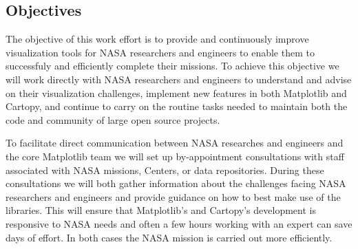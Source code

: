 \documentclass[12pt]{article}
\numberwithin{page}{section}
\begin{document}
\subsection{Objectives}



%

The objective of this work effort is to provide and continuously improve
visualization tools for NASA researchers and engineers to enable them to
successfuly and efficiently complete their missions.
To achieve this objective we will work directly with NASA
researchers and engineers to understand and advise on their visualization
challenges, implement new features in both Matplotlib and Cartopy, and continue
to carry on the routine tasks needed to maintain both the code and community
of large open source projects.

To facilitate direct communication between NASA researches and engineers and
the core Matplotlib team we will set up by-appointment consultations with staff
associated with NASA missions, Centers, or data repositories.  During these
consultations we will both gather information about the challenges facing NASA
researchers and engineers and provide guidance on how to best make use of the
libraries.
This will ensure that Matplotlib's and Cartopy's development is
responsive to NASA needs and often a few hours working with an expert
can save days of effort.  In both cases the NASA mission is carried out more efficiently.
\end{document}
